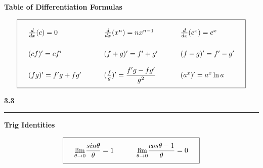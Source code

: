 \documentclass{article}
\begin{document}
\begin{center}
\Large\textbf{Table of Differentiation Formulas}
\begin{large}
\[\arraycolsep=16pt\def\arraystretch{2.5}
\begin{array}{| l l l |}
	\hline
	\frac{d}{dx} (c) = 0 & \frac{d}{dx} (x^n) = nx^{n-1} & \frac{d}{dx} (e^x) = e^x \\
	(cf)' = cf' & (f+g)' = f' + g' & (f-g)' = f'-g' \\
	(fg)' = f'g + fg' & (\frac{f}{g})' = \dfrac{f'g - fg'}{g^2} & (a^x)' = a^x \ln a \\
	[\medskipamount]
	\hline
\end{array}
\]
\end{large}
\end{center}
\pagebreak

\begin{center}
\Large\textbf{3.3}

\noindent\hfill\rule{0.3\textwidth}{.4pt}\hfill
\vspace{12pt}

\large\textbf{Trig Identities}\\
\end{center}
\[\arraycolsep=16pt\def\arraystretch{2.5}
\begin{array}{|c c|}
	\hline
	\underset{\theta \to 0}{\lim} \dfrac{sin\theta}{\theta} = 1 &
	\underset{\theta \to 0}{\lim} \dfrac{cos\theta - 1}{\theta} = 0 \\
	[\medskipamount]
	\hline
\end{array}
	\]
\vspace{12pt}
\end{document}
